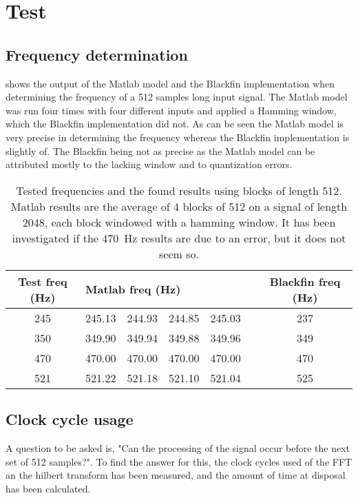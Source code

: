 
\section{Test}
\label{sec:test}
\subsection{Frequency determination}
 shows the output of the Matlab model and the Blackfin implementation when determining the frequency of a \num{512} samples long input signal.
The Matlab model was run four times with four different inputs and applied a Hamming window, which the Blackfin implementation did not.
As can be seen the Matlab model is very precise in determining the frequency whereas the Blackfin implementation is slightly of.
The Blackfin being not as precise as the Matlab model can be attributed mostly to the lacking window and to quantization errors.

\begin{table}
	\centering
	\begin{tabular}{c | c c c c c | c}
		\toprule
		Test freq (Hz) & \multicolumn{4}{l}{Matlab freq (Hz)} & & Blackfin freq (Hz) \\
		\midrule
		\num{245} & \num{245.13} & \num{244.93} & \num{244.85} & \num{245.03} && \num{237}\\
		\num{350} & \num{349.90} & \num{349.94} & \num{349.88} & \num{349.96} && \num{349}\\
		\num{470} & \num{470.00} & \num{470.00} & \num{470.00} & \num{470.00} && \num{470} \\
		\num{521} & \num{521.22} & \num{521.18} & \num{521.10} & \num{521.04} && \num{525} \\
		\bottomrule
	\end{tabular}
	\caption{Tested frequencies and the found results using blocks of length \num{512}. Matlab results are the average of 4 blocks of \num{512} on a signal of length \num{2048}, each block windowed with a hamming window. It has been investigated if the \SI{470}{\hertz} results are due to an error, but it does not seem so.}
	\label{tab:test}
\end{table}

\subsection{Clock cycle usage}
A question to be asked is, "Can the processing of the signal occur before the next set of 512 samples?".
To find the answer for this, the clock cycles used of the FFT an the hilbert transform has been measured, and the amount of time at disposal has been calculated.

